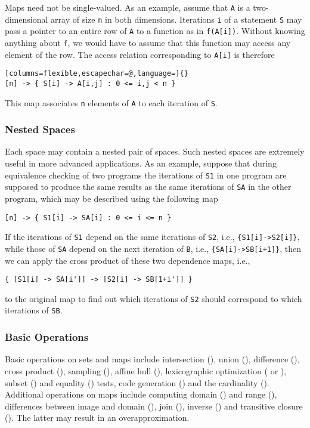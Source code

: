 Maps need not be single-valued.
As an example, assume that \lstinline{A} is a two-dimensional
array of size \lstinline{n} in both dimensions.
Iterations \lstinline{i} of
a statement \lstinline{S} may pass a pointer to an entire row
of \lstinline{A} to a function as in \lstinline{f(A[i])}.
Without knowing anything about \lstinline{f}, we would have
to assume that this function may access any element of the row.
The access relation corresponding to \lstinline{A[i]} is therefore
\begin{lstlisting}[columns=flexible,escapechar=@,language=]{}
[n] -> { S[i] -> A[i,j] : 0 <= i,j < n }
\end{lstlisting}
This map associates \lstinline{n} elements of \lstinline{A}
to each iteration of \lstinline{S}.

\subsubsection{Nested Spaces}

Each space may contain a nested pair of spaces.  Such nested spaces
are extremely useful in more advanced applications.
As an example, suppose that during equivalence checking
of two programs the iterations of \verb!S1! in one program are supposed to
produce the same results as the same iterations of \verb!SA! in the other program,
which may be described using the following map
\begin{verbatim}
[n] -> { S1[i] -> SA[i] : 0 <= i <= n }
\end{verbatim}
If the iterations of \verb!S1! depend on the same iterations
of \verb!S2!, i.e., \verb!{S1[i]->S2[i]}!, while those of \verb!SA!
depend on the next iteration of \verb!B!, i.e., \verb!{SA[i]->SB[i+1]}!,
then we can apply the cross product of these two dependence maps, i.e.,
\begin{verbatim}
{ [S1[i] -> SA[i']] -> [S2[i] -> SB[1+i']] }
\end{verbatim}
to the original map to find
out which iterations of \verb!S2! should correspond to which
iterations of \verb!SB!.

\subsubsection{Basic Operations}

Basic operations on sets and maps include intersection (\ai[\tt]{*}),
union (\ai[\tt]{+}), difference (\ai[\tt]{-}), cross product (),
sampling (), affine hull (),
lexicographic optimization ( or ),
subset (\ai[\tt]{<=}) and equality (\ai[\tt]{=}) tests,
code generation ()
and the cardinality ().
Additional operations on maps include computing domain ()
and range (), differences between image and domain (),
join (), inverse () and transitive closure (\ai[\tt]{\^{}+}).
The latter may result in an overapproximation.

